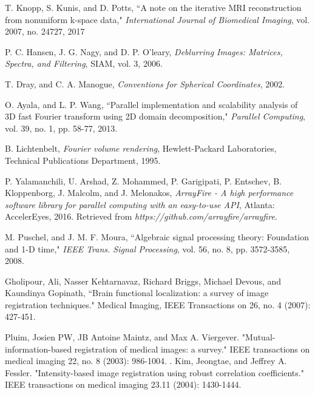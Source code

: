 \documentclass{UCF_ETD}
\begin{document}
\begin{thebibliography}{99}
T. Knopp, S. Kunis, and D. Potts, ``A note on the iterative MRI reconstruction from nonuniform k-space data," \emph{International Journal of Biomedical Imaging}, vol. 2007,  no. 24727,  2017

P. C. Hansen, J. G. Nagy, and D. P. O'leary, \emph{Deblurring Images: Matrices, Spectra, and Filtering}, SIAM, vol. 3, 2006.

T. Dray, and C. A. Manogue, \emph{Conventions for Spherical Coordinates}, 2002.

O. Ayala, and L. P. Wang, ``Parallel implementation and scalability analysis of 3D fast Fourier transform using 2D domain decomposition," \emph{Parallel Computing}, vol. 39, no. 1, pp. 58-77, 2013.

B. Lichtenbelt, \emph{Fourier volume rendering}, Hewlett-Packard Laboratories, Technical Publications Department, 1995.

P. Yalamanchili, U. Arshad, Z. Mohammed, P. Garigipati, P. Entschev,
B. Kloppenborg,  J. Malcolm, and J. Melonakos, \emph{ArrayFire - A high performance software library for parallel computing with an easy-to-use API}, Atlanta: AccelerEyes, 2016. Retrieved from \emph{https://github.com/arrayfire/arrayfire}.


M. Puschel, and J. M. F. Moura, ``Algebraic signal processing theory: Foundation and 1-D time," \emph{IEEE Trans. Signal Processing}, vol. 56, no. 8, pp. 3572-3585, 2008.



Gholipour, Ali, Nasser Kehtarnavaz, Richard Briggs, Michael Devous, and Kaundinya Gopinath, ``Brain functional localization: a survey of image registration techniques." Medical Imaging, IEEE Transactions on 26, no. 4 (2007): 427-451.

Pluim, Josien PW, JB Antoine Maintz, and Max A. Viergever. "Mutual-information-based registration of medical images: a survey." IEEE transactions on medical imaging 22, no. 8 (2003): 986-1004.
.
Kim, Jeongtae, and Jeffrey A. Fessler. "Intensity-based image registration using robust correlation coefficients." IEEE transactions on medical imaging 23.11 (2004): 1430-1444.


\end{thebibliography}
\end{document}
